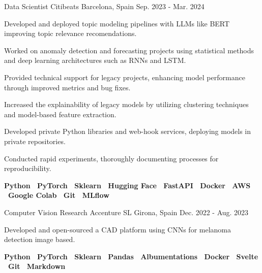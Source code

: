 \begin{cventries}
  \cventry
  {Data Scientist} %
  {Citibeats} %
  {Barcelona, Spain} %
  {Sep. 2023 - Mar. 2024} %
  {
  \begin{cvitems}
    \item {Developed and deployed topic modeling pipelines with LLMs like BERT improving topic relevance recomendations.}
    \item {Worked on anomaly detection and forecasting projects using statistical methods and deep learning architectures
      such as RNNs and LSTM.}
    \item {Provided technical support for legacy projects, enhancing model performance through improved metrics and bug fixes.}
    \item {Increased the explainability of legacy models by utilizing clustering techniques and model-based feature extraction.}
    \item {Developed private Python libraries and web-hook services, deploying models in private repositories.}
    \item {Conducted rapid experiments, thoroughly documenting processes for reproducibility.}
    \item {
      \textbf{
        Python \textbar \
        PyTorch \textbar \
        Sklearn \textbar \
        Hugging Face \textbar \
        FastAPI \textbar \
        Docker \textbar \
        AWS \textbar \
        Google Colab \textbar \
        Git \textbar \
        MLflow
      }
    }
  \end{cvitems}
  }


    \cventry
    {Computer Vision Research} %
    {Accenture SL} %
    {Girona, Spain} %
    {Dec. 2022 - Aug. 2023} %
    {
    \begin{cvitems}
    \item {Developed and open-sourced a CAD platform using CNNs for melanoma detection image based.}
    \item {
      \textbf{
        Python \textbar \
        PyTorch \textbar \
        Sklearn \textbar \
        Pandas \textbar \
        Albumentations \textbar \
        Docker \textbar \
        Svelte \textbar \
        Git \textbar \
        Markdown \
     }
    }
    \end{cvitems}
    }


\end{cventries}

